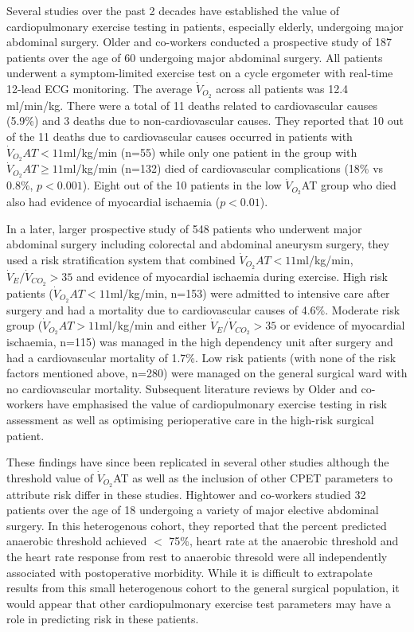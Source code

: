 Several studies over the past 2 decades have established the value of cardiopulmonary exercise testing in patients, especially elderly, undergoing major abdominal surgery. Older and co-workers conducted a prospective study of 187 patients over the age of 60 undergoing major abdominal surgery. All patients underwent a symptom-limited exercise test on a cycle ergometer with real-time 12-lead ECG monitoring. The average $\dot{V}_{O_2}$ across all patients was 12.4 ml/min/kg. There were a total of 11 deaths related to cardiovascular causes (5.9\%) and 3 deaths due to non-cardiovascular causes. They reported that 10 out of the 11 deaths due to cardiovascular causes occurred in patients with $\dot{V}_{O_2}AT<11$ml/kg/min (n=55) while only one patient in the group with $\dot{V}_{O_2}AT\geq11$ml/kg/min (n=132) died of cardiovascular complications (18\% vs 0.8\%, $p<0.001$). Eight out of the 10 patients in the low $\dot{V}_{O_2}$AT group who died also had evidence of myocardial ischaemia ($p<0.01$).\parencite{older_preoperative_1993}
 
In a later, larger prospective study of 548 patients who underwent major abdominal surgery including colorectal and abdominal aneurysm surgery, they used a risk stratification system that combined $\dot{V}_{O_2}AT<11$ml/kg/min, $\dot{V}_E/\dot{V}_{CO_2}>35$ and evidence of myocardial ischaemia during exercise. High risk patients ($\dot{V}_{O_2}AT<11$ml/kg/min, n=153) were admitted to intensive care after surgery and had a mortality due to cardiovascular causes of 4.6\%. Moderate risk group ($\dot{V}_{O_2}AT>11$ml/kg/min and either $\dot{V}_E/\dot{V}_{CO_2}>35$ or evidence of myocardial ischaemia, n=115) was managed in the high dependency unit after surgery and had a cardiovascular mortality of 1.7\%. Low risk patients (with none of the risk factors mentioned above, n=280) were managed on the general surgical ward with no cardiovascular mortality.\parencite{older_cardiopulmonary_1999} Subsequent literature reviews by Older and co-workers have emphasised the value of cardiopulmonary exercise testing in risk assessment as well as optimising perioperative care in the high-risk surgical patient. \parencite{older_preoperative_2000, older_clinical_2004, older_preoperative_2005}

These findings have since been replicated in several other studies although the threshold value of $\dot{V}_{O_2}$AT as well as the inclusion of other CPET parameters to attribute risk differ in these studies. Hightower and co-workers studied 32 patients over the age of 18 undergoing a variety of major elective abdominal surgery. In this heterogenous cohort, they reported that the percent predicted anaerobic threshold achieved $<$ 75\%, heart rate at the anaerobic threshold and the heart rate response from rest to anaerobic thresold were all independently associated with postoperative morbidity. While it is difficult to extrapolate results from this small heterogenous cohort to the general surgical population, it would appear that other cardiopulmonary exercise test parameters may have a role in predicting risk in these patients.\parencite{hightower_pilot_2010}

